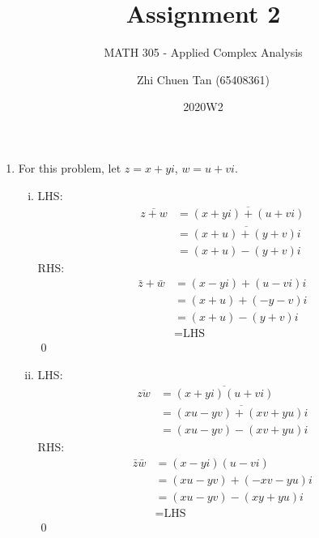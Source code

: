 \documentclass[a4paper, titlepage, DIV=14]{scrartcl}
\title{Assignment 2}
\subtitle{MATH 305 - Applied Complex Analysis}
\author{Zhi Chuen Tan (65408361)}
\date{2020W2}
\begin{document}
    \onehalfspacing
    \hypersetup{pageanchor=false}
    \begin{titlepage}
        \maketitle
        \vfill
        
    \end{titlepage}
    \hypersetup{pageanchor=true}

    \begin{enumerate}
        \item For this problem, let $z=x+yi$, $w=u+vi$.
        
        \begin{enumerate}[i)]
            \item LHS:
            \begin{align*}
                \overline{z+w} &= \overline{(x+yi)+(u+vi)} \\
                            &= \overline{(x+u) + (y+v)i} \\
                            &= (x+u) - (y+v)i
            \end{align*}
            RHS:
            \begin{align*}
                \bar{z} + \bar{w} &= (x-yi) + (u-vi)i \\
                            &= (x+u) + (-y-v)i \\
                            &= (x+u) - (y+v)i \\
                            &= \text{LHS}
            \end{align*} 
            \qed
            
            \item LHS:
            \begin{align*}
                \overline{zw} &= \overline{(x+yi)(u+vi)} \\
                &= \overline{(xu-yv) + (xv+yu)i} \\
                &= (xu-yv) - (xv+yu)i
            \end{align*}
            RHS:
            \begin{align*}
                \bar{z}\bar{w} &= (x-yi)(u-vi) \\
                    &= (xu - yv) + (-xv-yu)i \\
                    &= (xu - yv) - (xy + yu)i \\
                    &= \text{LHS}
            \end{align*}\qed
            

\end{enumerate}
\end{enumerate}
\end{document}
